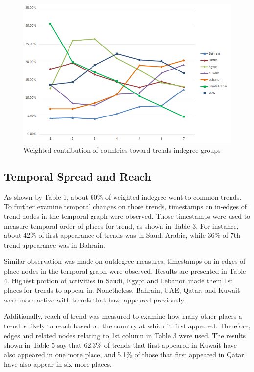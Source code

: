 \documentclass{llncs}
\begin{document}
\begin{figure}[htb]
\centering
\includegraphics[width=\columnwidth]{images/weightedcontributions.png}
\caption{Weighted contribution of countries toward trends indegree groups}
\label{fig:weightedcontributions}
\end{figure}

\subsection{Temporal Spread and Reach}

As shown by Table 1, about 60\% of weighted indegree went to common
trends. To further examine temporal changes on those trends,
timestamps on in-edges of trend nodes in the temporal graph were
observed. Those timestamps were used to measure temporal order of
places for trend, as shown in Table 3. For instance, about 42\% of
first appearance of trends was in Saudi Arabia, while 36\% of 7th
trend appearance was in Bahrain.


Similar observation was made on outdegree measures, timestamps on
in-edges of place nodes in the temporal graph were observed. Results
are presented in Table 4. Highest portion of activities in Saudi,
Egypt and Lebanon made them 1st places for trends to appear
in. Nonetheless, Bahrain, UAE, Qatar, and Kuwait were more active with
trends that have appeared previously.


Additionally, reach of trend was measured to examine how many other
places a trend is likely to reach based on the country at which it
first appeared. Therefore, edges and related nodes relating to 1st
column in Table 3 were used. The results shown in Table 5 say that
62.3\% of trends that first appeared in Kuwait have also appeared in
one more place, and 5.1\% of those that first appeared in Qatar have
also appear in six more places.
\end{document}
